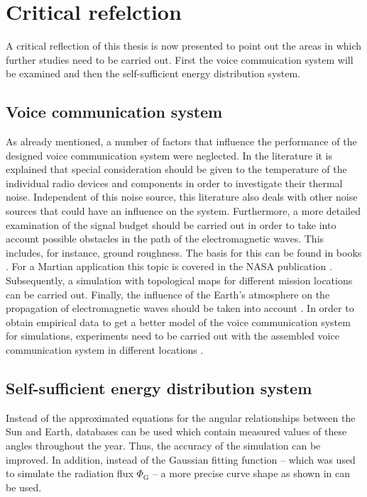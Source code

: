 \section{Critical refelction}
A critical reflection of this thesis is now presented to point out the areas in which further studies need to be carried out. First the voice commuication system will be examined and then the self-sufficient energy distribution system.

\subsection{Voice communication system}
As already mentioned, a number of factors that influence the performance of the designed voice communication system were neglected. In the literature \cite{Glover:2010} it is explained that special consideration should be given to the temperature of the individual radio devices and components in order to investigate their thermal noise. Independent of this noise source, this literature also deals with other noise sources that could have an influence on the system. Furthermore, a more detailed examination of the signal budget should be carried out in order to take into account possible obstacles in the path of the electromagnetic waves. This includes, for instance, ground roughness. The basis for this can be found in books \cite{Parsons:2000, Mecklenbrauker:2017}. For a Martian application this topic is covered in the NASA publication \cite{Ho:2002}. Subsequently, a simulation with topological maps for different mission locations can be carried out. Finally, the influence of the Earth's atmosphere on the propagation of electromagnetic waves should be taken into account \cite{Glover:2010, Parsons:2000}. In order to obtain empirical data to get a better model of the voice communication system for simulations, experiments need to be carried out with the assembled voice communication system in different locations \cite{LinkMargin:2016}. 

\subsection{Self-sufficient energy distribution system}
Instead of the approximated equations for the angular relationships between the Sun and Earth, databases can be used which contain measured values of these angles throughout the year. Thus, the accuracy of the \MATLAB simulation can be improved. In addition, instead of the Gaussian fitting function -- which was used to simulate the radiation flux $\Phi_\mathrm{G}$ -- a more precise curve shape as shown in \cite{Babikir:2020} can be used. 

